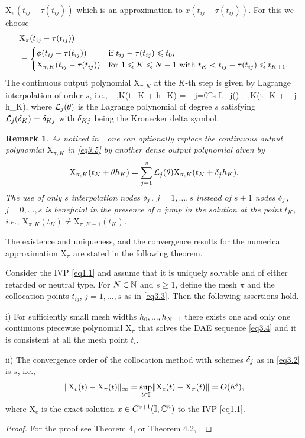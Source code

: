 \documentclass[final,reqno]{siamltex}
\newtheorem{remark}[theorem]{Remark}
\begin{document}
$\mathrm{X}_{\pi}(t_{ij}-\tau(t_{ij}))$ which is an approximation to $x(t_{ij}-\tau(t_{ij}))$. For this we choose
%
\[
\begin{split} 
&  \mathrm{X}_{\pi}(t_{ij}-\tau(t_{ij})) \\
 & =  
 \begin{cases}
  \phi(t_{ij}-\tau(t_{ij}))                & \mbox{if } t_{ij}-\tau(t_{ij}) \leqslant t_0, \\
  \mathrm{X}_{\pi,K}(t_{ij}-\tau(t_{ij}))  & \mbox{for $ 1 \leqslant K \leqslant N-1$ with } t_K < t_{ij}-\tau(t_{ij}) \leqslant t_{K+1}.
 \end{cases}
 \end{split} 
\]
%
The continuous output polynomial $\mathrm{X}_{\pi,K}$ at the $K$-th step is given by Lagrange interpolation of order $s$, i.e.,
%
\be\label{eq3.5}
 _{\pi,K}(t_K + \tet h_K) = \sum_{j=0}^s {\cal L}_j(\tet) _{\pi,K}(t_K + \de_j h_K),
\ee
%
where ${\cal L}_j(\tet)$ is the Lagrange polynomial of degree $s$ satisfying ${\cal L}_j(\de_K) = \de_{Kj}$ with $\delta_{Kj}$ being the Kronecker delta symbol.

\begin{remark}
 As noticed in \cite{GugH01,GugH07}, one can optionally replace the continuous output polynomial $\mathrm{X}_{\pi,K}$ in \eqref{eq3.5} by another dense output polynomial given by
 \[
  \mathrm{X}_{\pi,K}(t_K + \tet h_K) = \sum_{j=1}^s {\cal L}_j(\tet) \mathrm{X}_{\pi,K}(t_K + \de_j h_K).
 \]
 The use of only $s$ interpolation nodes $\delta_j$, $j=1,\dots,s$ instead of $s+1$ nodes $\delta_j$, $j=0,\dots,s$ is beneficial in the presence of a jump in the solution at the
 point $t_K$, i.e., $\mathrm{X}_{\pi,K}(t_K) \not= \mathrm{X}_{\pi,K-1}(t_K)$.
\end{remark}

The existence and uniqueness, and the convergence results for the numerical approximation $\mathrm{X}_{\pi}$ are stated in the following theorem.

\begin{theorem}\label{Thm6.1}
Consider the IVP \eqref{eq1.1} and assume that it is uniquely solvable and of either retarded or neutral type. 
For $N \in \mathbb{N}$ and $s \geq 1$, define the mesh $\pi$ and the collocation points $t_{ij}$, $j=1,\dots,s$ as in \eqref{eq3.3}. 
Then the following assertions hold.
\begin{compactenum}
 \item[i)] For sufficiently small mesh widths $h_0,\dots,h_{N-1}$ there exists one and only one continuous piecewise polynomial $\mathrm{X}_{\pi}$ that solves 
 the DAE sequence \eqref{eq3.4} and it is consistent at all the mesh point $t_i$.
 \item[ii)] The convergence order of the collocation method with schemes $\delta_j$ as in \eqref{eq3.2} is $s$, i.e., 
 \[
  \| \mathrm{X}_e(t) - \mathrm{X}_{\pi}(t) \|_{\infty} = \underset{t \in \mathbb{I}}{\sup} \| \mathrm{X}_e(t) - \mathrm{X}_{\pi}(t) \| = O(h^s),
 \]
%
 where $\mathrm{X}_e$ is the exact solution  $x \in C^{s+1}(\mathbb{I},\mathbb{C}^n)$ to the IVP \eqref{eq1.1}.
\end{compactenum}
\end{theorem}
\begin{proof}
For the proof see Theorem 4, \cite{Hau97} or Theorem 4.2, \cite{GugH07}.
\end{proof}
%
\end{document}
